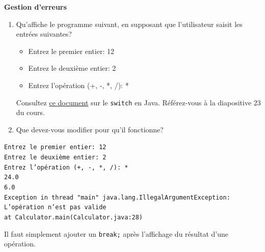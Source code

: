 \begin{Exercice}[5 minutes] [Java] \textbf{Gestion d'erreurs} 
    \begin{enumerate}
    \item Qu'affiche le programme suivant, en supposant que l'utilisateur saisit les entrées suivantes? \\

    \begin{itemize}
        \item Entrez le premier entier: 12
        \item Entrez le deuxième entier: 2
        \item Entrez l'opération (+, -, *, /): *
    \end{itemize}

    \begin{conseil}
            Consultez \href{https://moodle.unil.ch/mod/resource/view.php?id=2218920f}{ce document} sur le \texttt{switch} en Java. Référez-vous à la diapositive 23 du cours. 
     \end{conseil}

     \item Que devez-vous modifier pour qu'il fonctionne?
    \end{enumerate}
    
    \begin{solution}
    \texttt{Entrez le premier entier: 12 \\ 
Entrez le deuxième entier: 2 \\
Entrez l'opération (+, -, *, /): * \\ 
24.0\\
6.0\\
Exception in thread "main" java.lang.IllegalArgumentException: L'opération n'est pas valide \\
        at Calculator.main(Calculator.java:28)}
    \end{solution}
\begin{solution}
Il faut simplement ajouter un \texttt{break;} après l'affichage du résultat d'une opération. 
\end{solution}

 \end{Exercice}

